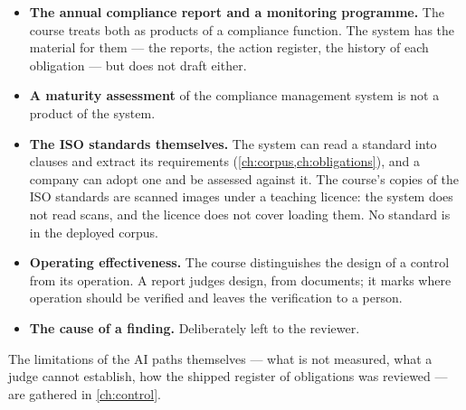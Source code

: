 \begin{itemize}
  \item \textbf{The annual compliance report and a monitoring programme.} The course treats
    both as products of a compliance function. The system has the material for them --- the
    reports, the action register, the history of each obligation --- but does not draft
    either.
  \item \textbf{A maturity assessment} of the compliance management system is not a product of
    the system.
  \item \textbf{The ISO standards themselves.} The system can read a standard into clauses and
    extract its requirements (\cref{ch:corpus,ch:obligations}), and a company can adopt one
    and be assessed against it. The course's copies of the ISO standards are scanned images
    under a teaching licence: the system does not read scans, and the licence does not cover
    loading them. No standard is in the deployed corpus.
  \item \textbf{Operating effectiveness.} The course distinguishes the design of a control
    from its operation. A report judges design, from documents; it marks where operation
    should be verified and leaves the verification to a person.
  \item \textbf{The cause of a finding.} Deliberately left to the reviewer.
\end{itemize}

The limitations of the AI paths themselves --- what is not measured, what a judge cannot
establish, how the shipped register of obligations was reviewed --- are gathered in
\cref{ch:control}.
